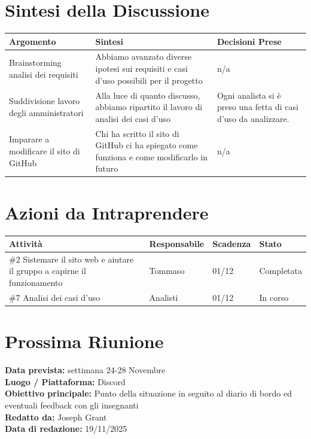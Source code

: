 \documentclass[a4paper,12pt]{article}
\begin{document}
\section*{ Sintesi della Discussione}

\begin{longtable}{|p{}|p{}|p{}|}
\hline
\textbf{Argomento} & \textbf{Sintesi} & \textbf{Decisioni Prese} \\ \hline
 Brainstorming analisi dei requisiti&Abbiamo avanzato diverse ipotesi sui requisiti e casi d'uso possibili per il progetto&n/a  \\ \hline
Suddivisione lavoro degli amministratori& Alla luce di quanto discusso, abbiamo ripartito il lavoro di analisi dei casi d'uso  & Ogni analista si è preso una fetta di casi d'uso da analizzare.  \\ \hline

Imparare a modificare il sito di GitHub& Chi ha scritto il sito di GitHub ci ha spiegato come funziona e come modificarlo in futuro  & n/a  \\ \hline
\end{longtable}


\section*{ Azioni da Intraprendere}

\begin{longtable}{|p{}|p{}|p{}|p{}|}
\hline
\textbf{Attività} & \textbf{Responsabile} & \textbf{Scadenza} & \textbf{Stato} \\ \hline
  \#2 Sistemare il sito web e aiutare il gruppo a capirne il funzionamento&Tommaso  & 01/12 &Completata \\ \hline
 \#7 Analisi dei casi d'uso&Analisti& 01/12 &In corso \\ \hline

  
  
\end{longtable}



\section*{ Prossima Riunione}
\textbf{Data prevista:} settimana 24-28 Novembre\\
\textbf{Luogo / Piattaforma:} Discord \\
\textbf{Obiettivo principale:} Punto della situazione in seguito al diario di bordo ed eventuali feedback con gli insegnanti\\


\textbf{Redatto da:} Joseph Grant \\
\textbf{Data di redazione:} 19/11/2025
\end{document}
